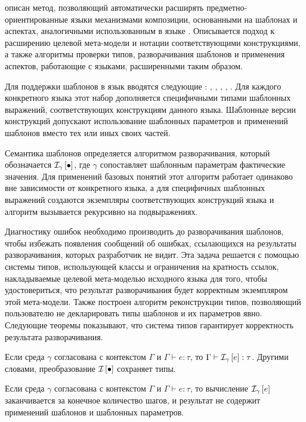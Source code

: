 \renewcommand{\thepart}{4}
 описан метод, позволяющий автоматически расширять предметно-ориентированные языки механизмами композиции, основанными на шаблонах и аспектах, аналогичными использованным в языке \GRM{}. Описывается подход к расширению целевой мета-модели и нотации соответствующими конструкциями, а также алгоритмы проверки типов, разворачивания шаблонов и применения аспектов, работающие с языками, расширенными таким образом.

Для поддержки шаблонов в язык вводятся следующие : , , , , . Для каждого конкретного языка этот набор дополняется специфичными типами шаблонных выражений, соответствующих конструкциям данного языка. Шаблонные версии конструкций допускают использование шаблонных параметров и применений шаблонов вместо тех или иных своих частей. 

Семантика шаблонов определяется алгоритмом разворачивания, который обозначается $\mathcal{I}_{\gamma} \left[ \bullet \right]$, где  $\gamma$ сопоставляет шаблонным параметрам фактические значения. Для применений базовых понятий этот алгоритм работает одинаково вне зависимости от конкретного языка, а для специфичных шаблонных выражений создаются экземпляры соответствующих конструкций языка и алгоритм вызывается рекурсивно на подвыражениях.

Диагностику ошибок необходимо производить до разворачивания шаблонов, чтобы избежать появления сообщений об ошибках, ссылающихся на результаты разворачивания, которых разработчик не видит. Эта задача решается с помощью системы типов, использующей классы и ограничения на кратность ссылок, накладываемые целевой мета-моделью исходного языка для того, чтобы удостовериться, что результат разворачивания будет корректным экземпляром этой мета-модели. 
Также построен алгоритм реконструкции типов, позволяющий пользователю не декларировать типы шаблонов и их параметров явно. Следующие теоремы показывают, что система типов гарантирует корректность результата разворачивания.

\begin{Th}
Если среда $\gamma$ согласована с контекстом $\Gamma$ и $\Gamma \vdash e : \tau$, то $\Gamma \vdash \mathcal{I}_{\gamma} \left[ e \right] : \tau$. Другими словами, преобразование $\mathcal{I}_{} \left[ \bullet \right]$ сохраняет типы.
\end{Th}

\begin{Th}[О нормализации]
Если среда $\gamma$ согласована с контекстом $\Gamma$ и $\Gamma \vdash e : \tau$, то вычисление $\mathcal{I}_{\gamma} \left[ e \right]$ заканчивается за конечное количество шагов, и результат не содержит применений шаблонов и шаблонных параметров.
\end{Th}


